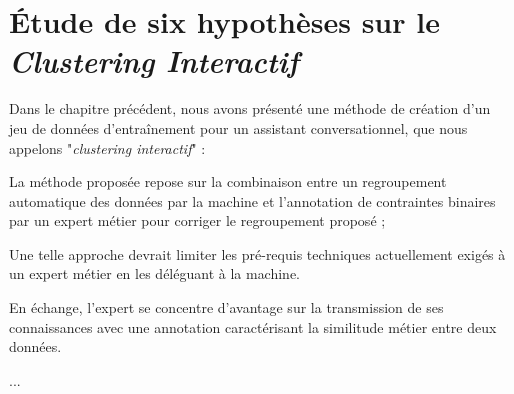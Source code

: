 \chapter{Étude de six hypothèses sur le \textit{Clustering Interactif}}
\label{chapter:4-ETUDES}
	
	Dans le chapitre précédent, nous avons présenté une méthode de création d'un jeu de données d’entraînement pour un assistant conversationnel, que nous appelons "\textit{clustering interactif}" :
	\begin{leftBarImportantGreen}
		\begin{todolist}
			\item[\itemok] La méthode proposée repose sur la combinaison entre un regroupement automatique des données par la machine et l'annotation de contraintes binaires par un expert métier pour corriger le regroupement proposé ;
			\item[\itemok] Une telle approche devrait limiter les pré-requis techniques actuellement exigés à un expert métier en les déléguant à la machine.
			\item[\itemok] En échange, l'expert se concentre d'avantage sur la transmission de ses connaissances avec une annotation caractérisant la similitude métier entre deux données.
			\item[\itemok] ...
		\end{todolist}
	\end{leftBarImportantGreen}
	
